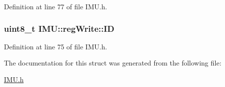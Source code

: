Definition at line 77 of file IMU.h.

\hypertarget{struct_i_m_u_1_1reg_write_aca32b881a20ec7adc84956176aa65a7b}{
\subsubsection[{ID}]{\setlength{\rightskip}{0pt plus 5cm}uint8\_\-t {\bf IMU::regWrite::ID}}}
\label{struct_i_m_u_1_1reg_write_aca32b881a20ec7adc84956176aa65a7b}


Definition at line 75 of file IMU.h.



The documentation for this struct was generated from the following file:\begin{DoxyCompactItemize}
\item 
\hyperlink{_i_m_u_8h}{IMU.h}\end{DoxyCompactItemize}
